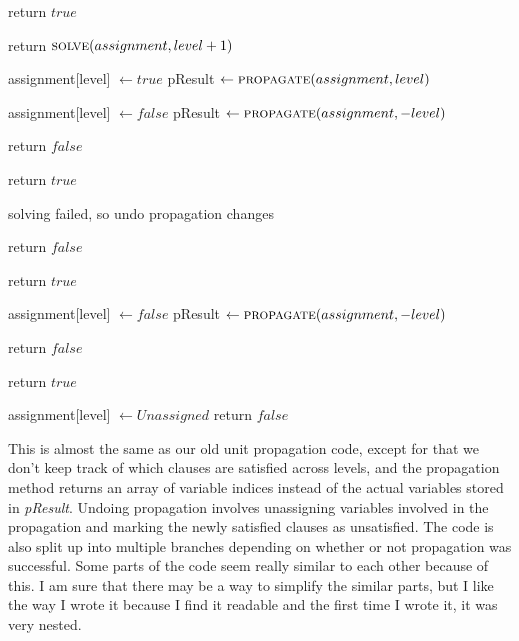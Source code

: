 \begin{algorithm}[H]
\caption{Modified solving method}\label{alg:18}
\begin{algorithmic}[1]

    \State return $true$
\EndIf

    \State return $\Call{solve}{assignment, level + 1}$
\EndIf

\State assignment[level] $\gets true$
\State pResult $\gets \Call{propagate}{assignment, level}$

    \State assignment[level] $\gets false$
    \State pResult $\gets \Call{propagate}{assignment, -level}$

        \State return $false$
    \EndIf

        \State return $true$
    \EndIf

    \Comment solving failed, so undo propagation changes

    \State {}
    \State return $false$
\EndIf

    \State return $true$
\EndIf

\State {}

\State assignment[level] $\gets false$
\State pResult $\gets \Call{propagate}{assignment, -level}$

    \State return $false$
\EndIf

    \State return $true$
\EndIf

\State {}
\State assignment[level] $\gets Unassigned$
\State return $false$

\EndProcedure
\end{algorithmic}
\end{algorithm}

This is almost the same as our old unit propagation code, except for that we don't 
keep track of which clauses are satisfied across levels, and the propagation method 
returns an array of variable indices instead of the actual variables stored in \textit{pResult}.
Undoing propagation involves unassigning variables involved in the propagation and marking 
the newly satisfied clauses as unsatisfied. The code is also split up into multiple branches 
depending on whether or not propagation was successful. Some parts of the code seem really 
similar to each other because of this. I am sure that there may be a way to simplify the similar 
parts, but I like the way I wrote it because I find it readable and the first time I wrote it, it 
was very nested.

